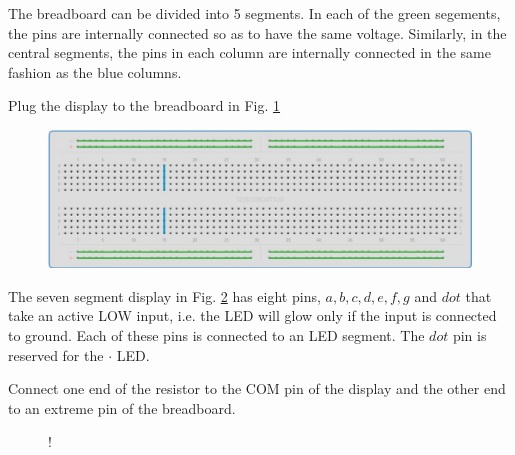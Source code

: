 The breadboard can be divided into 5 segments.  In each of the green segements, the pins are internally connected so as to have the same voltage.  Similarly, in the central segments, the pins in each column  are internally connected in the same fashion as the blue columns. 

\begin{problem}
	Plug the display to the breadboard in Fig. \ref{fig:breadboard}
\end{problem}
\begin{figure}[!h]
\begin{center}
\includegraphics[width=\columnwidth]{./figs/breadboard}
\end{center}
\caption{}
\label{fig:breadboard}
\end{figure}

The seven segment display in Fig. \ref{fig:sevenseg} has eight pins, $a, b, c, d, e, f, g$ and $dot$ that take an active LOW input, i.e.  the LED will glow only if the input is connected to ground.  Each of these pins is connected to an LED segment.  The $dot$ pin is  reserved for the $\cdot$ LED.  

%

\begin{problem}
	Connect one end of the resistor to the COM pin of the display and the other end to an extreme pin of the breadboard.	
\end{problem}
%
%
\begin{figure}[!h]
\begin{center}
 {!} {

}
\end{center}
\caption{}
\label{fig:sevenseg}
\end{figure}

